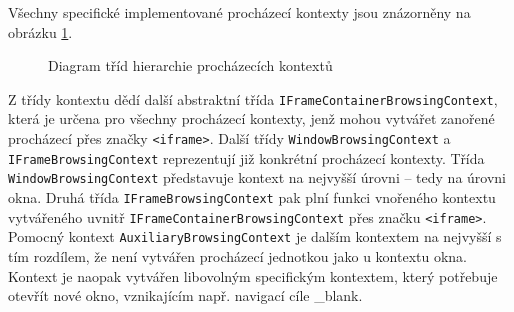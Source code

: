 Všechny specifické implementované procházecí kontexty jsou znázorněny na obrázku \ref{Figure.BrowsingContextsHierarchy}.

\begin{figure}[H]
  \begin{center}
    \caption{Diagram tříd hierarchie procházecích kontextů}
    \label{Figure.BrowsingContextsHierarchy}
  \end{center}
\end{figure}

Z třídy kontextu dědí další abstraktní třída \texttt{IFrameContainerBrowsingContext}, která je určena pro všechny procházecí kontexty, jenž mohou vytvářet zanořené procházecí přes značky \texttt{<iframe>}. Další třídy \texttt{WindowBrowsingContext} a \texttt{IFrameBrowsingContext} reprezentují již konkrétní procházecí kontexty. Třída \texttt{WindowBrowsingContext} představuje kontext na nejvyšší úrovni – tedy na úrovni okna. Druhá třída \texttt{IFrameBrowsingContext} pak plní funkci vnořeného kontextu vytvářeného uvnitř \texttt{IFrameContainerBrowsingContext} přes značku \texttt{<iframe>}. Pomocný kontext \texttt{AuxiliaryBrowsingContext} je dalším kontextem na nejvyšší s tím rozdílem, že není vytvářen procházecí jednotkou jako u kontextu okna. Kontext je naopak vytvářen libovolným specifickým kontextem, který potřebuje otevřít nové okno, vznikajícím např. navigací cíle \_blank.

